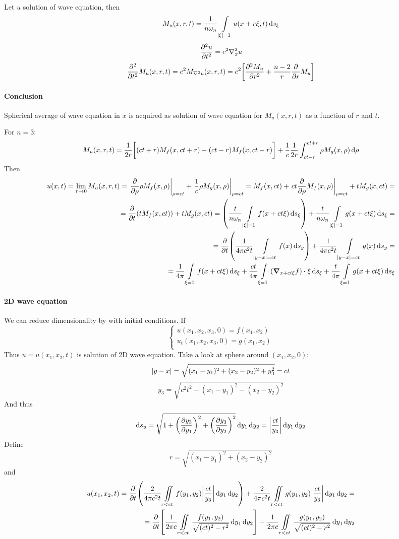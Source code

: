 Let $u$ solution of  wave equation, then
$$M_u(x,r,t) = \frac{1}{n\omega_n} \int\limits_{\abs{\xi} = 1} u(x+r\xi, t) \dd{s_\xi}$$
$$\pdv[2]{u}{t} = c^2 \laplacian_x{u}$$
$$\pdv[2]{t} M_u(x,r,t) = c^2 M_{\laplacian{u}}(x,r,t) = c^2\qty[\pdv[2]{M_u}{r} + \frac{n-2}{r}\pdv{r}M_u]$$

\paragraph{Conclusion} Spherical average of wave equation in $x$ is acquired as solution of wave equation for $M_u(x,r,t)$ as a function of $r$ and $t$.

For $n=3$:
$$M_u(x,r,t) = \frac{1}{2r}\qty\bigg[(ct+r) M_f(x,ct+r) - (ct-r)M_f(x,ct-r)] + \frac{1}{c}\frac{1}{2r} \int_{ct-r}^{ct+r} \rho M_g(x,\rho) \dd{\rho}$$
Then
\begin{align*}
u(x,t) = \lim_{r\to 0} M_u(x,r,t) = \eval{\pdv{\rho} \rho M_f(x,\rho)}_{\rho=ct} + \eval{\frac{1}{c} \rho M_g(x,\rho)}_{\rho=ct}= M_f(x,ct) + \eval{ct \pdv{\rho} M_f(x,\rho)}_{\rho=ct} + tM_g(x,ct) =\\=
\pdv{t} \qty(t M_f(x,ct)) + tM_g(x,ct) = \qty(\frac{t}{n\omega_n} \int\limits_{\abs{\xi} = 1} f(x+ct\xi) \dd{s_\xi}) + \frac{t}{n\omega_n} \int\limits_{\abs{\xi} = 1} g(x+ct\xi) \dd{s_\xi} =\\= \pdv{t} \qty(\frac{1}{4\pi c^2 t} \int\limits_{\abs{y-x} =ct} f(x) \dd{s_y} ) + \frac{1}{4\pi c^2 t} \int\limits_{\abs{y-x} =ct} g(x) \dd{s_y} =\\= \frac{1}{4\pi} \int\limits_{\xi=1} f(x+ct\xi) \dd{s_\xi} + \frac{ct}{4\pi}  \int\limits_{\xi=1} \qty(\grad_{x+ct\xi}f)\vdot \xi \dd{s_\xi}+ \frac{t}{4\pi}  \int\limits_{\xi=1}  g(x+ct\xi) \dd{s_\xi}
\end{align*}


\paragraph{2D wave equation}
We can reduce dimensionality by with initial conditions. If
$$\begin{cases}
u(x_1,x_2,x_3,0)= f(x_1,x_2)\\
u_t(x_1,x_2,x_3,0)= g(x_1,x_2)\\
\end{cases}$$
Thus $u=u(x_1,x_2,t)$ is solution of 2D wave equation. Take a look at sphere around $(x_1,x_2,0)$:
$$\abs{y-x}= \sqrt{(x_1-y_1)^2+(x_2-y_2)^2 +y_3^2} = ct$$
$$y_3 = \sqrt{c^2t^2 - (x_1-y_1)^2-(x_2-y_2)^2}$$
And thus
$$\dd{s_y} = \sqrt{1+\qty(\pdv{y_3}{y_1})^2 +\qty(\pdv{y_3}{y_2})^2}\dd{y_1}\dd{y_2} = \abs{ \frac{ct}{y_3}} \dd{y_1}\dd{y_2}$$
Define
$$r = \sqrt{(x_1-y_1)^2+(x_2-y_2)^2}$$
and
\begin{align*}
u(x_1,x_2,t) = \pdv{t} \qty(\frac{2}{4\pi c^2 t } \iint\limits_{r<ct} f(y_1,y_2) \abs{ \frac{ct}{y_3}}\dd{y_1}\dd{y_2}) + \frac{2}{4\pi c^2 t } \iint\limits_{r<ct} g(y_1,y_2) \abs{ \frac{ct}{y_3}}\dd{y_1}\dd{y_2} =\\= \pdv{t} \qty[\frac{1}{2\pi c} \iint\limits_{r<ct} \frac{f(y_1,y_2)}{\sqrt{(ct)^2-r^2}} \dd{y_1}\dd{y_2}] + \frac{1}{2\pi c} \iint\limits_{r<ct} \frac{g(y_1,y_2)}{\sqrt{(ct)^2-r^2}} \dd{y_1}\dd{y_2}
\end{align*}
